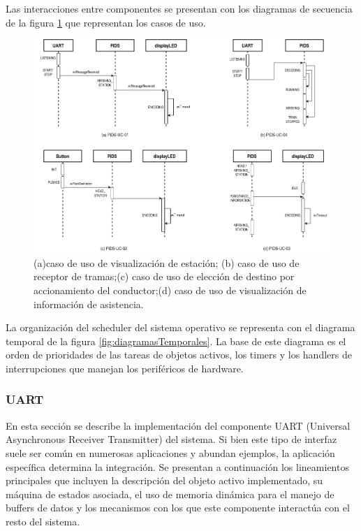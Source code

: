 Las interacciones entre componentes se presentan con los diagramas de secuencia de la figura \ref{fig:diagramaSecuenciaSistema} que representan los casos de uso.

\begin{figure}[ht]
	\centering
	\includegraphics[width=1\textwidth]{../Figures/secuenciasSistema.png}
	\caption{(a)caso de uso de visualización de estación; (b) caso de uso de receptor de tramas;(c) caso de uso de elección de destino por accionamiento del conductor;(d) caso de uso de visualización de información de asistencia.}
	\label{fig:diagramaSecuenciaSistema}
\end{figure}


La organización del scheduler del sistema operativo se representa con el diagrama temporal de la figura \ref{fig:diagramasTemporales}. La base de este diagrama es el orden de prioridades de las tareas de objetos activos, los timers y los handlers de interrupciones que manejan los periféricos de hardware.\\

\subsubsection{UART}

En esta sección se describe la implementación del componente UART (Universal Asynchronous Receiver Transmitter) del sistema. Si bien este tipo de interfaz suele ser común en numerosas aplicaciones y abundan ejemplos, la aplicación específica determina la integración. Se presentan a continuación los lineamientos principales que incluyen la descripción del objeto activo implementado, su máquina de estados asociada, el uso de memoria dinámica para el manejo de buffers de datos y los mecanismos con los que este componente interactúa con el resto del sistema.




